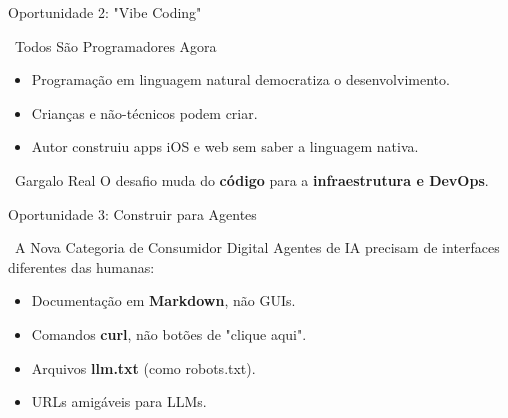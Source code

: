 \documentclass[aspectratio=169,12pt]{beamer}
\begin{document}
\begin{frame}{Oportunidade 2: "Vibe Coding"}
    \begin{block}{\faUsers\, Todos São Programadores Agora}
        \begin{itemize}
            \item Programação em linguagem natural democratiza o desenvolvimento.
            \item Crianças e não-técnicos podem criar.
            \item Autor construiu apps iOS e web sem saber a linguagem nativa.
        \end{itemize}
    \end{block}
    
    \begin{alertblock}{\faExclamationTriangle\, Gargalo Real}
        O desafio muda do \textbf{código} para a \textbf{infraestrutura e DevOps}.
    \end{alertblock}
\end{frame}

\begin{frame}{Oportunidade 3: Construir para Agentes}
    \begin{block}{\faRobot\, A Nova Categoria de Consumidor Digital}
        Agentes de IA precisam de interfaces diferentes das humanas:
        \begin{itemize}
            \item Documentação em \textbf{Markdown}, não GUIs.
            \item Comandos \textbf{curl}, não botões de "clique aqui".
            \item Arquivos \textbf{llm.txt} (como robots.txt).
            \item URLs amigáveis para LLMs.
        \end{itemize}
    \end{block}
\end{frame}
\end{document}
